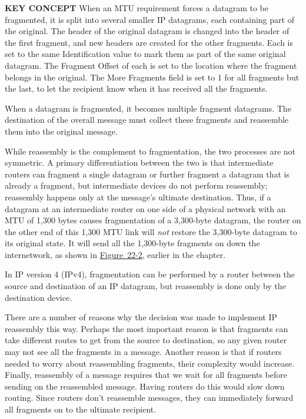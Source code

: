 {\textbf{KEY CONCEPT}} When an MTU requirement forces a datagram to be
fragmented, it is split into several smaller IP datagrams, each
containing part of the original. The header of the original datagram is
changed into the header of the first fragment, and new headers are
created for the other fragments. Each is set to the same Identification
value to mark them as part of the same original datagram. The Fragment
Offset of each is set to the location where the fragment belongs in the
original. The More Fragments field is set to 1 for all fragments but the
last, to let the recipient know when it has received all the fragments.

\protect\hypertarget{ch22s03.html}{}{}

\protect\hypertarget{ch22s03.htmlux5cux23idx-CHP-22-0814}{}{}When a
datagram is fragmented, it becomes multiple fragment datagrams. The
destination of the overall message must collect these fragments and
reassemble them into the original message.

While
\protect\hypertarget{ch22s03.htmlux5cux23idx-CHP-22-0815}{}{}reassembly
is the complement to fragmentation, the two processes are not symmetric.
A primary differentiation between the two is that intermediate routers
can fragment a single datagram or further fragment a datagram that is
already a fragment, but intermediate devices do not perform reassembly;
reassembly happens only at the message's ultimate destination. Thus, if
a datagram at an intermediate router on one side of a physical network
with an MTU of 1,300 bytes causes fragmentation of a 3,300-byte
datagram, the router on the other end of this 1,300 MTU link will
{\emph{not}} restore the 3,300-byte datagram to its original state. It
will send all the 1,300-byte fragments on down the internetwork, as
shown in
\protect\hyperlink{ch22.htmlux5cux23ipv4_datagram_fragmentation_this_example}{Figure~22-2},
earlier in the chapter.

In IP version 4 (IPv4), fragmentation can be performed by a router
between the source and destination of an IP datagram, but reassembly is
done only by the destination device.

There are a number of reasons why the decision was made to implement IP
reassembly this way. Perhaps the most important reason is that fragments
can take different routes to get from the source to destination, so any
given router may not see all the fragments in a message. Another reason
is that if routers needed to worry about reassembling fragments, their
complexity would increase. Finally, reassembly of a message requires
that we wait for all fragments before sending on the reassembled
message. Having routers do this would slow down routing. Since routers
don't reassemble messages, they can immediately forward all fragments on
to the ultimate recipient.

